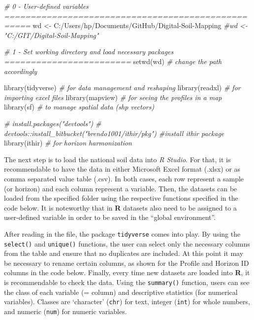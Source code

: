 \documentclass[
  10pt,
  b5paper,
  oneside]{book}
\newenvironment{Shaded}{\begin{snugshade}}{\end{snugshade}}
\newcommand{\CommentTok}[1]{\textcolor[rgb]{0.56,0.35,0.01}{\textit{#1}}}
\newcommand{\FunctionTok}[1]{\textcolor[rgb]{0.00,0.00,0.00}{#1}}
\newcommand{\NormalTok}[1]{#1}
\newcommand{\OtherTok}[1]{\textcolor[rgb]{0.56,0.35,0.01}{#1}}
\newcommand{\StringTok}[1]{\textcolor[rgb]{0.31,0.60,0.02}{#1}}
\begin{document}
\begin{Shaded}
\begin{Highlighting}[]
\CommentTok{\# 0 {-} User{-}defined variables ===================================================}
\NormalTok{wd }\OtherTok{\textless{}{-}} \StringTok{\textquotesingle{}C:/Users/hp/Documents/GitHub/Digital{-}Soil{-}Mapping\textquotesingle{}}
\CommentTok{\#wd \textless{}{-} "C:/GIT/Digital{-}Soil{-}Mapping"}

\CommentTok{\# 1 {-} Set working directory and load necessary packages ========================}
\FunctionTok{setwd}\NormalTok{(wd) }\CommentTok{\# change the path accordingly}

\FunctionTok{library}\NormalTok{(tidyverse) }\CommentTok{\# for data management and reshaping}
\FunctionTok{library}\NormalTok{(readxl) }\CommentTok{\# for importing excel files}
\FunctionTok{library}\NormalTok{(mapview) }\CommentTok{\# for seeing the profiles in a map}
\FunctionTok{library}\NormalTok{(sf) }\CommentTok{\# to manage spatial data (shp vectors) }

\CommentTok{\# install.packages("devtools") }
\CommentTok{\# devtools::install\_bitbucket("brendo1001/ithir/pkg") \#install ithir package}
\FunctionTok{library}\NormalTok{(ithir) }\CommentTok{\# for horizon harmonization}
\end{Highlighting}
\end{Shaded}

The next step is to load the national soil data into \emph{R Studio}. For that, it is recommendable to have the data in either Microsoft Excel format (.xlsx) or as comma separated value table (.csv). In both cases, each row represent a sample (or horizon) and each column represent a variable. Then, the datasets can be loaded from the specified folder using the respective functions specified in the code below. It is noteworthy that in \textbf{R} datasets also need to be assigned to a user-defined variable in order to be saved in the ``global environment''.

After reading in the file, the package \texttt{tidyverse} comes into play. By using the \texttt{select()} and \texttt{unique()} functions, the user can select only the necessary columns from the table and ensure that no duplicates are included. At this point it may be necessary to rename certain columns, as shown for the Profile and Horizon ID columns in the code below.
Finally, every time new datasets are loaded into \textbf{R}, it is recommendable to check the data. Using the \texttt{summary()} function, users can see the class of each variable (= column) and descriptive statistics (for numerical variables). Classes are `character' (\texttt{chr}) for text, integer (\texttt{int}) for whole numbers, and numeric (\texttt{num}) for numeric variables.
\end{document}
